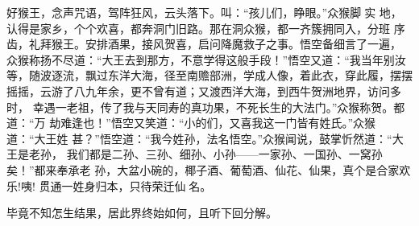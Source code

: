 好猴王，念声咒语，驾阵狂风，云头落下。叫：“孩儿们，睁眼。”众猴脚实
地，认得是家乡，个个欢喜，都奔洞门旧路。那在洞众猴，都一齐簇拥同入，分班
序齿，礼拜猴王。安排酒果，接风贺喜，启问降魔救子之事。悟空备细言了一遍，
众猴称扬不尽道：“大王去到那方，不意学得这般手段！”悟空又道：“我当年别汝
等，随波逐流，飘过东洋大海，径至南赡部洲，学成人像，着此衣，穿此履，摆摆
摇摇，云游了八九年余，更不曾有道；又渡西洋大海，到西牛贺洲地界，访问多时，
幸遇一老祖，传了我与天同寿的真功果，不死长生的大法门。”众猴称贺。都道：“万
劫难逢也！”悟空又笑道：“小的们，又喜我这一门皆有姓氏。”众猴道：“大王姓
甚？”悟空道：“我今姓孙，法名悟空。”众猴闻说，鼓掌忻然道：“大王是老孙，
我们都是二孙、三孙、细孙、小孙——一家孙、一国孙、一窝孙矣！”都来奉承老
孙，大盆小碗的，椰子酒、葡萄酒、仙花、仙果，真个是合家欢乐!咦!
贯通一姓身归本，只待荣迁仙名。

毕竟不知怎生结果，居此界终始如何，且听下回分解。